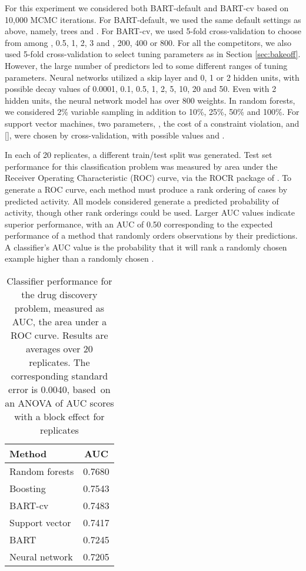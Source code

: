 \documentclass[aoas,nameyear,dvips]{arximspdf}
\newcommand{\citeasnoun}[1]{\citet{#1}}
\begin{document}
For this experiment we considered both BART-default and BART-cv based
on 10,000 MCMC iterations.  For BART-default, we used the same default
settings as above, namely,  trees and .  For BART-cv, we
used 5-fold cross-validation to choose from among , 0.5, 1, 2,
3 and , 200, 400 or 800.  For all the competitors, we also
used 5-fold cross-validation to select tuning parameters as in Section
\ref{sec:bakeoff}.  However, the large number of predictors led to some
different ranges of tuning parameters.   Neural networks utilized a
skip layer and 0, 1 or 2 hidden units, with possible decay values of
0.0001, 0.1, 0.5, 1, 2, 5, 10, 20 and 50.  Even with 2 hidden units,
the neural network model has over 800 weights.  In random forests, we
considered 2\% variable sampling in addition to 10\%, 25\%, 50\% and
100\%. For support vector machines, two parameters, , the cost of a
constraint violation, and  [\citet{CC01a}], were chosen by
cross-validation, with possible values  and
.

In each of 20 replicates, a different train/test split was generated.
Test set performance for this classification problem was measured by area under the
Receiver Operating Characteristic (ROC) curve, via the ROCR package of
\citeasnoun{ROCR}.  To generate a ROC curve, each method must produce a rank
ordering of cases by predicted activity.  All models considered generate a
predicted probability of activity, though other rank orderings could be
used.  Larger AUC values indicate superior performance, with an AUC of 0.50
corresponding to the expected performance of a method that randomly
orders observations by their predictions.  A classifier's AUC value
is the probability that it will rank a randomly chosen  example
higher than a randomly chosen . 
\begin{table}[b]
\caption{Classifier performance for the drug discovery problem, measured as
AUC, the area under a ROC curve.  Results are averages over 20 replicates.
The corresponding standard error is 0.0040, based~on an ANOVA of
AUC scores with a block effect for replicates}\label{tab:AUC}
\begin{tabular*}{6cm}{@{\extracolsep{\fill}}lc@{}}
\hline
\textbf{Method} & \textbf{AUC} \\
\hline
Random forests & 0.7680\\
Boosting       & 0.7543\\
BART-cv        & 0.7483\\
Support vector & 0.7417\\
BART           & 0.7245\\
Neural network & 0.7205\\
\hline
\end{tabular*}
\end{table}
\end{document}
